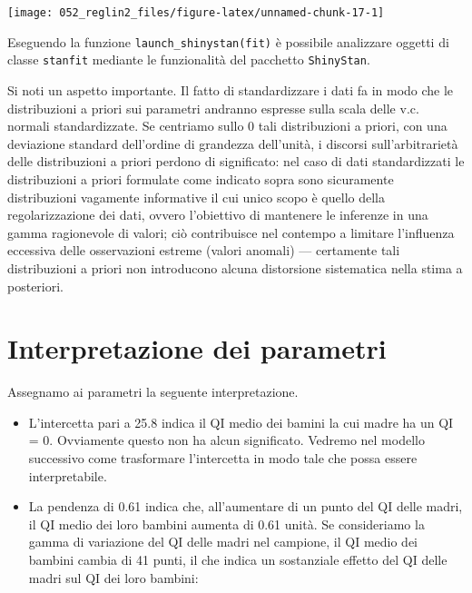 \documentclass[
]{memoir}
\providecommand{\tightlist}{%
  \setlength{\itemsep}{0pt}\setlength{\parskip}{0pt}}
\begin{document}
\begin{center}\texttt{[image: 052\_reglin2\_files/figure-latex/unnamed-chunk-17-1]} \end{center}

\noindent
Eseguendo la funzione \texttt{launch\_shinystan(fit)} è possibile analizzare oggetti di classe \texttt{stanfit} mediante le funzionalità del pacchetto \texttt{ShinyStan}.

Si noti un aspetto importante. Il fatto di standardizzare i dati fa in modo che le distribuzioni a priori sui parametri andranno espresse sulla scala delle v.c. normali standardizzate. Se centriamo sullo 0 tali distribuzioni a priori, con una deviazione standard dell'ordine di grandezza dell'unità, i discorsi sull'arbitrarietà delle distribuzioni a priori perdono di significato: nel caso di dati standardizzati le distribuzioni a priori formulate come indicato sopra sono sicuramente distribuzioni vagamente informative il cui unico scopo è quello della regolarizzazione dei dati, ovvero l'obiettivo di mantenere le inferenze in una gamma ragionevole di valori; ciò contribuisce nel contempo a limitare l'influenza eccessiva delle osservazioni estreme (valori anomali) --- certamente tali distribuzioni a priori non introducono alcuna distorsione sistematica nella stima a posteriori.

\hypertarget{interpretazione-dei-parametri}{%
\section{Interpretazione dei parametri}\label{interpretazione-dei-parametri}}

Assegnamo ai parametri la seguente interpretazione.

\begin{itemize}
\tightlist
\item
  L'intercetta pari a 25.8 indica il QI medio dei bamini la cui madre ha un QI = 0. Ovviamente questo non ha alcun significato. Vedremo nel modello successivo come trasformare l'intercetta in modo tale che possa essere interpretabile.
\item
  La pendenza di 0.61 indica che, all'aumentare di un punto del QI delle madri, il QI medio dei loro bambini aumenta di 0.61 unità. Se consideriamo la gamma di variazione del QI delle madri nel campione, il QI medio dei bambini cambia di 41 punti, il che indica un sostanziale effetto del QI delle madri sul QI dei loro bambini:
\end{itemize}
\end{document}
